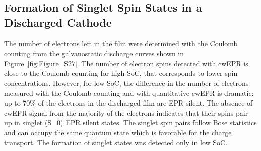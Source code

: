\subsection{Formation of Singlet Spin States in a Discharged Cathode}
The number of electrons left in the film were determined with the Coulomb counting from the galvanostatic discharge curves shown in Figure~\ref{fig:Figure_S27}. The number of electron spins detected with cwEPR is close to the Coulomb counting for high SoC, that corresponds to lower spin concentrations. However, for low SoC, the difference in the number of electrons measured with the Coulomb counting and with quantitative cwEPR is dramatic: up to 70\% of the electrons in the discharged film are EPR silent. The absence of cwEPR signal from the majority of the electrons indicates that their spins pair up in singlet (S=0) EPR silent states. The singlet spin pairs follow Bose statistics and can occupy the same quantum state which is favorable for the charge transport. The formation of singlet states was detected only in low SoC.




